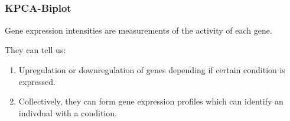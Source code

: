 \documentclass[serif]{beamer}
\begin{document}
\begin{frame}
\begin{equation}
\begin{matrix}
			\end{matrix}
			\end{equation}

	

	\end{frame}

	\begin{frame}
		\frametitle{KPCA-Biplot}
			Gene expression intensities  are measurements of the activity of each gene.\newline
			
			They can tell us:
			
			\begin{enumerate}
				\item Upregulation or downregulation of genes depending if certain condition is
				         expressed.
				\item Collectively, they can form gene expression profiles which can identify an
				         indivdual with a condition.
			\end{enumerate}
	\end{frame}
\end{document}
